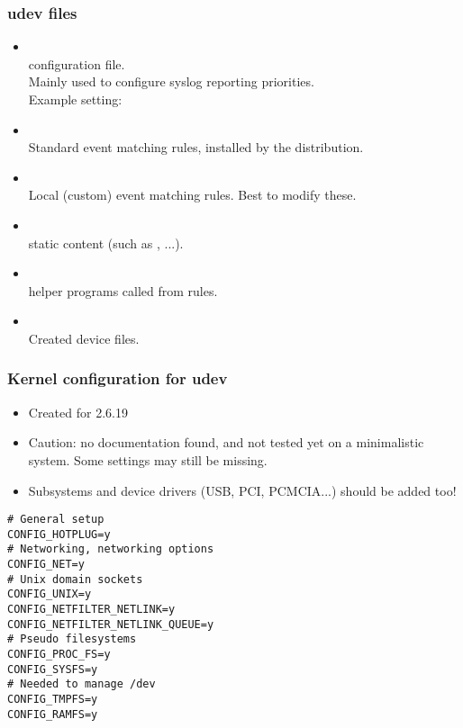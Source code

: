 \begin{frame}
  \frametitle{udev files}
  \begin{itemize}
  \item {}\\
     configuration file.\\
    Mainly used to configure syslog reporting priorities.\\
    Example setting: 
  \item {}\\
    Standard  event matching rules, installed by the distribution.
  \item {}\\
    Local (custom)  event matching rules. Best to modify these.
  \item {}\\
    static  content (such as ,
    ...).
  \item {}\\
    helper programs called from  rules.
  \item {}\\
    Created device files.
  \end{itemize}
\end{frame}

\begin{frame}[fragile]
  \frametitle{Kernel configuration for udev}
  \begin{itemize}
  \item Created for 2.6.19
  \item Caution: no documentation found, and not tested yet on a minimalistic system. Some settings may still be missing.
  \item Subsystems and device drivers (USB, PCI, PCMCIA...) should be added too!
  \end{itemize}
  \begin{block}{}
\tiny
\begin{verbatim}
# General setup
CONFIG_HOTPLUG=y
# Networking, networking options
CONFIG_NET=y
# Unix domain sockets
CONFIG_UNIX=y
CONFIG_NETFILTER_NETLINK=y
CONFIG_NETFILTER_NETLINK_QUEUE=y
# Pseudo filesystems
CONFIG_PROC_FS=y
CONFIG_SYSFS=y
# Needed to manage /dev
CONFIG_TMPFS=y
CONFIG_RAMFS=y
\end{verbatim}
  \end{block}
\end{frame}


